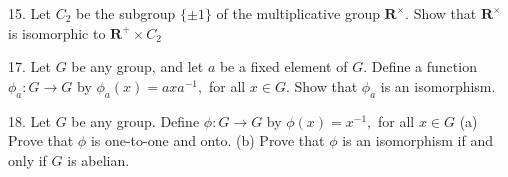 \begin{mdframed}[style=darkQuesion]
15. Let $C_{2}$ be the subgroup $\{\pm 1\}$ of the multiplicative group
$\mathbf{R}^{\times} .$ Show that $\mathbf{R}^{\times}$ is isomorphic to
$\mathbf{R}^{+} \times C_{2}$
\end{mdframed}
\begin{mdframed}[style=darkAnswer,frametitle={Joe Starr}]
\end{mdframed}
\newpage
\begin{mdframed}[style=darkQuesion]
17. Let $G$ be any group, and let $a$ be a fixed element of $G .$ Define a function $\phi_{a}: G \rightarrow G$
by $\phi_{a}(x)=a x a^{-1},$ for all $x \in G .$ Show that $\phi_{a}$ is an isomorphism.
\end{mdframed}
\begin{mdframed}[style=darkAnswer,frametitle={Joe Starr}]
\end{mdframed}
\newpage
\begin{mdframed}[style=darkQuesion]
18. Let $G$ be any group. Define $\phi: G \rightarrow G$ by $\phi(x)=x^{-1},$ for all $x \in G$
(a) Prove that $\phi$ is one-to-one and onto.
(b) Prove that $\phi$ is an isomorphism if and only if $G$ is abelian.
\end{mdframed}
\begin{mdframed}[style=darkAnswer,frametitle={Joe Starr}]
\end{mdframed}
\newpage
